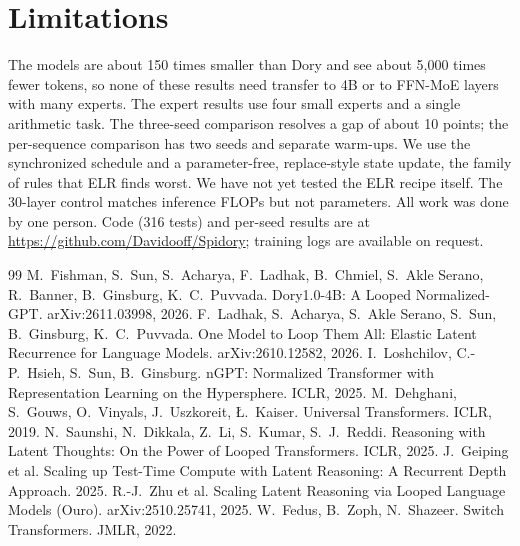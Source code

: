 \documentclass[11pt]{article}
\begin{document}
\section{Limitations}
The models are about 150 times smaller than Dory and see about 5{,}000 times fewer tokens, so none of these results need transfer to 4B or to FFN-MoE layers with many experts. The expert results use four small experts and a single arithmetic task. The three-seed comparison resolves a gap of about 10 points; the per-sequence comparison has two seeds and separate warm-ups. We use the synchronized schedule and a parameter-free, replace-style state update, the family of rules that ELR finds worst. We have not yet tested the ELR recipe itself. The 30-layer control matches inference FLOPs but not parameters. All work was done by one person. Code (316 tests) and per-seed results are at \url{https://github.com/Davidooff/Spidory}; training logs are available on request.

\begin{thebibliography}{99}\small
{} M.~Fishman, S.~Sun, S.~Acharya, F.~Ladhak, B.~Chmiel, S.~Akle Serano, R.~Banner, B.~Ginsburg, K.~C.~Puvvada. Dory1.0-4B: A Looped Normalized-GPT. arXiv:2611.03998, 2026.
 F.~Ladhak, S.~Acharya, S.~Akle Serano, S.~Sun, B.~Ginsburg, K.~C.~Puvvada. One Model to Loop Them All: Elastic Latent Recurrence for Language Models. arXiv:2610.12582, 2026.
 I.~Loshchilov, C.-P.~Hsieh, S.~Sun, B.~Ginsburg. nGPT: Normalized Transformer with Representation Learning on the Hypersphere. ICLR, 2025.
 M.~Dehghani, S.~Gouws, O.~Vinyals, J.~Uszkoreit, {\L}.~Kaiser. Universal Transformers. ICLR, 2019.
 N.~Saunshi, N.~Dikkala, Z.~Li, S.~Kumar, S.~J.~Reddi. Reasoning with Latent Thoughts: On the Power of Looped Transformers. ICLR, 2025.
 J.~Geiping et al. Scaling up Test-Time Compute with Latent Reasoning: A Recurrent Depth Approach. 2025.
 R.-J.~Zhu et al. Scaling Latent Reasoning via Looped Language Models (Ouro). arXiv:2510.25741, 2025.
 W.~Fedus, B.~Zoph, N.~Shazeer. Switch Transformers. JMLR, 2022.
\end{thebibliography}
\end{document}
